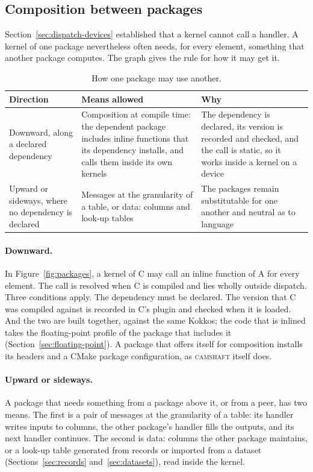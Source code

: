 \documentclass[11pt,a4paper]{article}
\newcommand{\camshaft}{\textsc{camshaft}}
\begin{document}
\subsection{Composition between packages}
\label{sec:composition}

Section~\ref{sec:dispatch-devices} established that a kernel cannot call a
handler.  A kernel of one package nevertheless often needs, for every
element, something that another package computes.  The graph gives the rule
for how it may get it.

\begin{table}[ht]
\centering
\small
\begin{tabularx}{\textwidth}{@{}>{\raggedright\arraybackslash}p{40mm} L L@{}}
\toprule
Direction & Means allowed & Why \\
\midrule
Downward, along a declared dependency & Composition at compile time: the dependent package includes inline functions that its dependency installs, and calls them inside its own kernels & The dependency is declared, its version is recorded and checked, and the call is static, so it works inside a kernel on a device \\
Upward or sideways, where no dependency is declared & Messages at the granularity of a table, or data: columns and look-up tables & The packages remain substitutable for one another and neutral as to language \\
\bottomrule
\end{tabularx}
\caption{How one package may use another.}
\label{tab:composition}
\end{table}

\paragraph{Downward.}  In Figure~\ref{fig:packages}, a kernel of C may call
an inline function of A for every element.  The call is resolved when C is
compiled and lies wholly outside dispatch.  Three conditions apply.  The
dependency must be declared.  The version that C was compiled against is
recorded in C's plugin and checked when it is loaded.  And the two are built
together, against the same Kokkos; the code that is inlined takes the
floating-point profile of the package that includes it
(Section~\ref{sec:floating-point}).  A package that offers itself for
composition installs its headers and a CMake package configuration, as
\camshaft{} itself does.

\paragraph{Upward or sideways.}  A package that needs something from a
package above it, or from a peer, has two means.  The first is a pair of
messages at the granularity of a table: its handler writes inputs to
columns, the other package's handler fills the outputs, and its next
handler continues.  The second is data: columns the other package
maintains, or a look-up table generated from records or imported from a
dataset (Sections~\ref{sec:records} and~\ref{sec:datasets}), read inside the
kernel.
\end{document}

